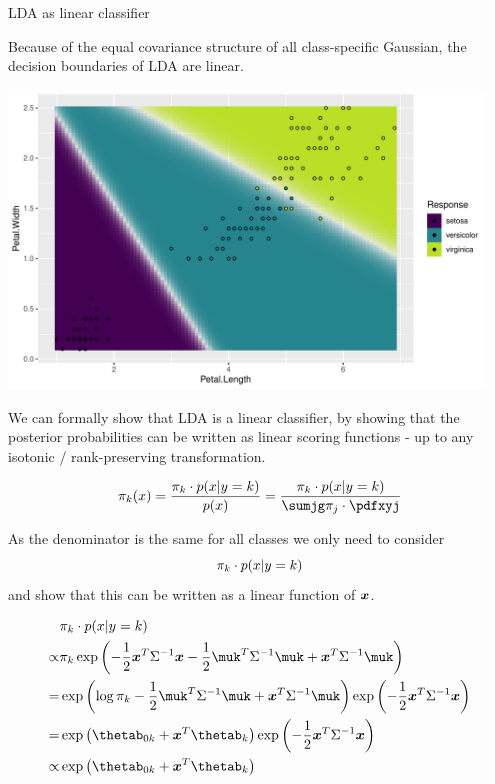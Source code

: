 \documentclass[11pt,compress,t,notes=noshow, xcolor=table]{beamer}
\newenvironment{knitrout}{}{} %
\begin{document}
\begin{vbframe}{LDA as linear classifier}

  Because of the equal covariance structure of all class-specific Gaussian, the decision boundaries
  of LDA are linear.

\begin{knitrout}\scriptsize
{}\color{fgcolor}

{\centering \includegraphics[width=0.95\textwidth]{figure/reg_class_dis_2} 

}



\end{knitrout}

\framebreak


We can formally show that LDA is a linear classifier, by showing that the posterior probabilities
can be written as linear scoring functions - up to any isotonic / rank-preserving transformation.

$$
  \pikx = \frac{\pik \cdot \pdfxyk }{\pdfx} = \frac{\pik \cdot \pdfxyk}{\sumjg \pi_j \cdot \pdfxyj}
$$

As the denominator is the same for all classes we only need to consider 
$$\pi_k \cdot p(x | y=k)$$ 
and show that this can be written as a linear function of $\bm{x}$.

\framebreak


\begin{eqnarray*}
& \pik \cdot \pdfxyk \\
  \propto& \pik \exp\left(- \frac{1}{2} \xv^T\Sigma^{-1}\xv - \frac{1}{2} \muk^T \Sigma^{-1} \muk + \xv^T \Sigma^{-1} \muk \right) \\
=& \exp\left(\log \pik  - \frac{1}{2} \muk^T \Sigma^{-1} \muk + \xv^T \Sigma^{-1} \muk \right) \exp\left(- \frac{1}{2} \xv^T\Sigma^{-1}\xv\right) \\
=& \exp\left(\thetab_{0k} + \xv^T \thetab_k\right) \exp\left(- \frac{1}{2} \xv^T\Sigma^{-1}\xv\right)\\
\propto& \exp\left(\thetab_{0k} + \xv^T \thetab_k\right) 
\end{eqnarray*}


\end{vbframe}
\end{document}

